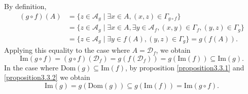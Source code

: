 \begin{proofenv}
    By definition, 
    \begin{align*}
        (g\circ f )(A)&=\{z\in \mathscr{A}_g\mid \exists x\in A, (x, z)\in \Gamma_{g\circ f}\}\\
        &=\{z\in \mathscr{A}_g\mid \exists x\in A, \exists y\in \mathscr{A}_f, (x, y)\in \Gamma_f, (y, z)\in \Gamma_g\}\\
        &=\{z\in \mathscr{A}_g\mid \exists  y\in f(A), (y, z)\in \Gamma_g\}=g(f(A)).
    \end{align*}
    Applying this equality to the case where $A=\mathscr{D}_f$,  we obtain
    $$\mathrm{Im}(g\circ f)=(g\circ f)(\mathscr{D}_f)=g(f(\mathscr{D}_f))=g(\mathrm{Im}(f))\subseteq \mathrm{Im}(g).$$
   In the case where $\mathrm{Dom}(g)\subseteq \mathrm{Im}(f)$,  by proposition \ref{proposition3.3.1} and \ref{proposition3.3.2} we obtain 
   $$\mathrm{Im}(g)=g(\mathrm{Dom}(g))\subseteq g(\mathrm{Im}(f))=\mathrm{Im}(g\circ f).$$ 
\end{proofenv}


